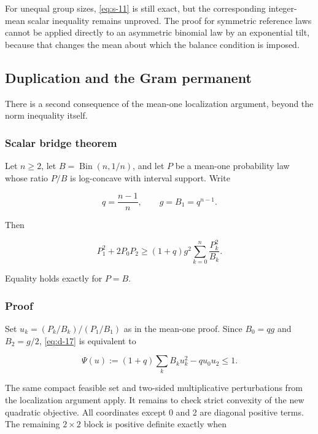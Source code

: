 \documentclass[11pt,a4paper]{article}
\theoremstyle{definition}
\theoremstyle{remark}
\begin{document}
For unequal group sizes, \eqref{eq:s-11} is still exact, but the corresponding
integer-mean scalar inequality remains unproved.
The proof for symmetric reference laws cannot be applied directly to an
asymmetric binomial law by an exponential tilt, because that changes the
mean about which the balance condition is imposed.

\subsection{Duplication and the Gram
permanent}\label{scalar-duplication-and-the-gram-permanent}

There is a second consequence of the mean-one localization argument,
beyond the norm inequality itself.

\subsubsection{Scalar bridge theorem}\label{scalar-scalar-bridge-theorem}

Let \(n\ge2\), let \(B=\operatorname{Bin}(n,1/n)\), and let \(P\) be a
mean-one probability law whose ratio \(P/B\) is log-concave with
interval support. Write

\[
q=\frac{n-1}{n},\qquad g=B_1=q^{n-1}.
\]

Then

\begin{equation}\label{eq:d-17}
\boxed{\quad
P_1^2+2P_0P_2
\ge (1+q)g^2\sum_{k=0}^n\frac{P_k^2}{B_k}.
\quad}
\end{equation}

Equality holds exactly for \(P=B\).

\subsubsection{Proof}\label{scalar-proof-1}

Set \(u_k=(P_k/B_k)/(P_1/B_1)\) as in the mean-one proof. Since
\(B_0=qg\) and \(B_2=g/2\), \eqref{eq:d-17} is equivalent to

\begin{equation}\label{eq:d-18}
\Psi(u):=(1+q)\sum_kB_ku_k^2-q u_0u_2\le1.
\end{equation}

The same compact feasible set and two-sided multiplicative perturbations
from the localization argument apply. It remains to check strict convexity
of the new quadratic objective. All coordinates except 0 and 2 are
diagonal positive terms. The remaining \(2\times2\) block is positive
definite exactly when
\end{document}
